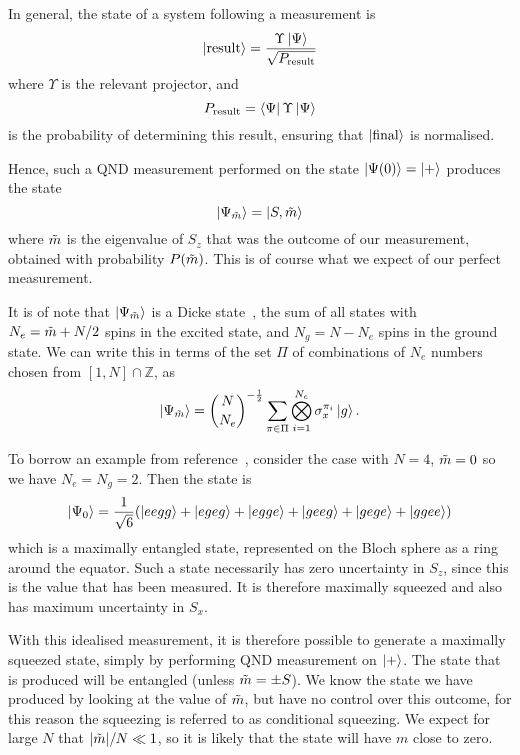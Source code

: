 In general, the state of a system following a measurement
is~\cite{gerry_knight_2004}
%
\begin{equation}
  \ket{\text{result}} = \frac{\Upsilon\ket{\Psi}}{\sqrt{P_\text{result}}}
  \label{squeeze:eqn:projresult}
\end{equation}
%
where $\Upsilon$ is the relevant projector, and
%
\begin{equation}
  P_\text{result} = \bra{\Psi}\Upsilon\ket{\Psi}
\end{equation}
%
is the probability of determining this result, ensuring that
$\ket{\text{final}}$ is normalised.

Hence, such a QND measurement performed on the state $\ket{\Psi(0)} =
\ket{+}$ produces the state
%
\begin{equation}
  \ket{\Psi_{\tilde{m}}} = \ket{S, \tilde{m}}
\end{equation}
%
where $\tilde{m}$ is the eigenvalue of $S_z$ that was the outcome of our
measurement, obtained with probability $P(\tilde{m})$. This is of course what we
expect of our perfect measurement.

It is of note that $\ket{\Psi_{\tilde{m}}}$ is a Dicke
state~\cite{Baertschi2019}, the sum of all states with $N_e = \tilde{m} + N/2$
spins in the excited state, and $N_g = N - N_e$ spins in the ground state.  We
can write this in terms of the set $\Pi$ of combinations of $N_e$ numbers
chosen from $[1,N]\cap\mathbb{Z}$, as
%
\begin{equation}
  \ket{\Psi_{\tilde{m}}} = \binom{N}{N_e}^{-\frac{1}{2}}\sum_{\pi \in \Pi}
  \bigotimes_{i=1}^{N_e} \sigma_x^{\pi_i} \ket{g}.
\end{equation}

To borrow an example from reference~\cite{Cox2016}, consider the case with
$N=4$, $\tilde{m}=0$ so we have $N_e = N_g = 2$. Then the state is
%
\begin{equation}
  \ket{\Psi_0} = \frac{1}{\sqrt{6}}(\ket{eegg} + \ket{egeg} + \ket{egge} +
  \ket{geeg} + \ket{gege} + \ket{ggee})
\end{equation}
%
which is a maximally entangled state, represented on the Bloch sphere as a ring
around the equator.
%
Such a state necessarily has zero uncertainty in $S_z$, since this is the value
that has been measured. It is therefore maximally squeezed and also has maximum
uncertainty in $S_x$.

With this idealised measurement, it is therefore possible to generate a maximally
squeezed state, simply by performing QND measurement on $\ket{+}$. The state
that is produced will be entangled (unless $\tilde{m} = \pm S$). We know the
state we have produced by looking at the value of $\tilde{m}$, but have no
control over this outcome, for this reason the squeezing is referred to as
conditional squeezing.
%
We expect for large $N$ that $|\tilde{m}|/N \ll 1$, so it is likely that the
state will have $m$ close to zero.

